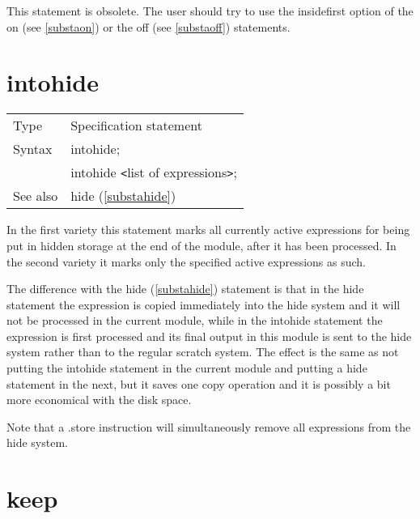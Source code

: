 \noindent This statement is obsolete. 
The user should try to use the insidefirst option of the on (see 
\ref{substaon}) or the off (see \ref{substaoff}) statements. \vspace{10mm}


\section{intohide}
\label{substaintohide}

\noindent \begin{tabular}{ll}
Type & Specification statement\\
Syntax & intohide; \\
       & intohide {\tt<}list of expressions{\tt>};
\\ See also & hide (\ref{substahide})
\end{tabular} \vspace{4mm}

\noindent In the first variety this statement marks all currently active 
expressions for being put in hidden storage at the end of the 
module, after it has been processed. In the second variety it marks only 
the specified active expressions as such. 
\vspace{4mm}

\noindent The difference with the hide (\ref{substahide}) statement is 
that in the hide statement the expression is copied immediately into the 
hide system and it will not be processed in the current module, while in 
the intohide statement the expression is first processed and its final 
output in this module is sent to the hide system rather than to the regular 
scratch system. The effect is the same as not putting the intohide 
statement in the current module and putting a hide statement in the next, 
but it saves one copy operation and it is possibly a bit more economical 
with the disk space.
\vspace{4mm}

\noindent Note that a .store instruction will simultaneously remove all 
expressions from the hide system. \vspace{10mm}

\section{keep}
\label{substakeep}

